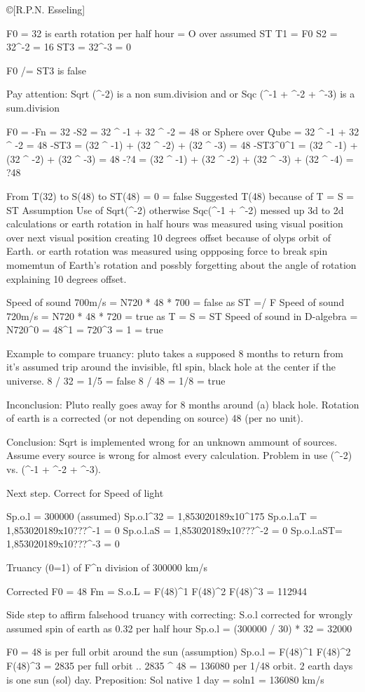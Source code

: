 \copyright[{R.P.N. Esseling}]

F0 = 32 is earth rotation per half hour = O over assumed ST 
T1 = F0
S2 = 32^-2 = 16 
ST3 = 32^-3 = 0

F0 /= ST3 is false

Pay attention: Sqrt (^-2) is a non sum.division 
and or Sqc (^-1 + ^-2 + ^-3) is a sum.division

F0 = -Fn = 32 
-S2 = 32 ^ -1 + 32 ^ -2 = 48 or Sphere over Qube = 32 ^ -1 + 32 ^ -2 = 48
-ST3 = (32 ^ -1) + (32 ^ -2) + (32 ^ -3) = 48
-ST3^0^1 = (32 ^ -1) + (32 ^ -2) + (32 ^ -3) = 48
-?4 = (32 ^ -1) + (32 ^ -2) + (32 ^ -3) + (32 ^ -4) = ?48 

From T(32) to S(48) to ST(48) = 0 = false
Suggested T(48) because of T = S = ST
Assumption Use of Sqrt(^-2) otherwise Sqc(^-1 + ^-2) 
messed up 3d to 2d calculations 
or earth rotation in half hours was measured using visual position over 
next visual position creating 10 degrees offset because of olyps orbit of Earth.
or earth rotation was measured using oppposing force
to break spin momemtun of Earth's rotation and possbly forgetting 
about the angle of rotation explaining 10 degrees offset.

Speed of sound 700m/s = N720 * 48 * 700 = false as ST =/ F
Speed of sound 720m/s = N720 * 48 * 720 = true as T = S = ST 
Speed of sound in D-algebra = N720^0 = 48^1 = 720^3 = 1 = true

Example to compare truancy:
pluto takes a supposed 8 months to return from it's assumed trip around 
the invisible, ftl spin, black hole at the center if the universe.
8 / 32 = 1/5 = false
8 / 48 = 1/8 = true

Inconclusion: Pluto really goes away for 8 months around (a) black hole.
Rotation of earth is a corrected (or not depending on source) 48 (per no unit).

Conclusion: Sqrt is implemented wrong for an unknown ammount of sources. 
Assume every source is wrong for almost every calculation.
Problem in use (^-2) vs. (^-1 + ^-2 + ^-3). 

Next step. Correct for Speed of light
 
Sp.o.l    = 300000 (assumed)
Sp.o.l^32 = 1,853020189x10^175
Sp.o.l.aT = 1,853020189x10???^-1 = 0
Sp.o.l.aS = 1,853020189x10???^-2 = 0
Sp.o.l.aST= 1,853020189x10???^-3 = 0

Truancy (0=1) of F^n division of 300000 km/s

Corrected
F0 = 48
Fm = S.o.L = F(48)^1 F(48)^2 F(48)^3 = 112944

Side step to affirm falsehood truancy with correcting:
S.o.l corrected for wrongly assumed spin of earth as 0.32 per half hour
Sp.o.l = (300000 / 30) * 32 = 32000

F0 = 48 is per full orbit around the sun (assumption)
Sp.o.l = F(48)^1 F(48)^2 F(48)^3 = 2835 per full orbit 
.. 2835 ^ 48 = 136080 per 1/48 orbit. 2 earth days is one sun (sol) day.
Preposition: Sol native 1 day = soln1 = 136080 km/s   



